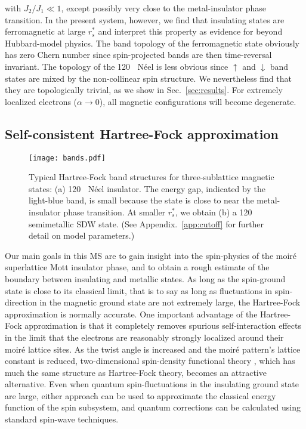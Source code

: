 \documentclass[%
 reprint,
 superscriptaddress,
 amsmath,amssymb,
 aps,
 prx,
 floatfix,
]{revtex4-2}
\newcommand{\<}{\langle}
\renewcommand{\>}{\rangle}
\renewcommand{\(}{\left(}
\renewcommand{\)}{\right)}
\renewcommand{\[}{\left[}
\renewcommand{\]}{\right]}
\DeclareMathOperator{\degree}{^{\circ}}
\begin{document}
with $J_2/J_1 \ll 1$, except possibly very close to the metal-insulator phase transition.
In the present system, however, we find that insulating states are ferromagnetic at 
large $r_s^*$ and interpret this property as evidence for beyond Hubbard-model physics.
The band topology of the ferromagnetic state obviously has zero Chern number since
spin-projected bands are then time-reversal invariant.  The topology of the 120$\degree$ N\'eel 
is less obvious since $\uparrow$ and $\downarrow$ band states are mixed by the non-collinear spin structure.
We nevertheless find that they are topologically trivial, as we show in 
Sec.~\ref{sec:results}. For extremely localized electrons ($\alpha\rightarrow0$), 
all magnetic configurations will become degenerate. 


\subsection{Self-consistent Hartree-Fock approximation}

\begin{figure}[!t]
    \centering
    \texttt{[image: bands.pdf]}
    \caption{Typical Hartree-Fock band structures for three-sublattice magnetic states: (a) 120$\degree$ N\'eel insulator. The energy gap, indicated by the light-blue band, is small because the state is close to near the metal-insulator phase transition. 
    At smaller $r_s^*$, we obtain (b) a 120$\degree$ semimetallic SDW state. (See Appendix.~\ref{app:cutoff} for further 
    detail on model parameters.) 
    }
    \label{fig:hfbands}
\end{figure}

Our main goals in this MS are to gain insight into the spin-physics of the moir\'e superlattice
Mott insulator phase, 
and to obtain a rough estimate of the boundary between insulating and metallic states.
As long as the spin-ground state is close to its classical limit, that is to say as long as fluctuations in 
spin-direction in the magnetic ground state are not extremely large, the Hartree-Fock approximation is normally 
accurate.  One important advantage of the Hartree-Fock approximation is that it completely
removes spurious self-interaction effects in the limit that the electrons are reasonably
strongly localized around their moir\'e lattice sites.  As the twist angle is increased and the
moir\'e pattern's lattice constant is reduced, two-dimensional spin-density functional theory \cite{liangfuCTI},
which has much the same structure as Hartree-Fock theory, becomes an attractive alternative.
Even when quantum spin-fluctuations in the insulating ground state are large, either approach can 
be used to approximate the classical energy function of the spin subsystem, and quantum corrections 
can be calculated using standard spin-wave techniques.  
\end{document}
